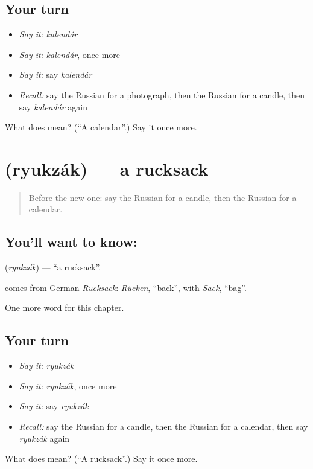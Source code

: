 \subsection*{Your turn}
\begin{itemize}
\raggedright
  \item \emph{Say it:} \emph{kalendár}
  \item \emph{Say it:} \emph{kalendár}, once more
  \item \emph{Say it:} say \emph{kalendár}
  \item \emph{Recall:} say the Russian for a photograph, then the Russian for a candle, then say \emph{kalendár} again
\end{itemize}

\begin{tcolorbox}[breakable,colback=teal!4,colframe=teal!35!black,title={Before you move on}]
What does  mean? (\textquotedblleft{}A calendar\textquotedblright{}.) Say it once more.
\end{tcolorbox}
\section[\texorpdfstring{\ru{рюкзак} (ryukzák)}{рюкзак (ryukzák)}]{ (ryukzák) — a rucksack}

\label{lesson:RU-C100-rucksack}



\begin{quote}
Before the new one: say the Russian for a candle, then the Russian for a calendar.
\end{quote}

\subsection*{You'll want to know: }
\textbf{} (\emph{ryukzák}) — \textquotedblleft{}a rucksack\textquotedblright{}.

\begin{cousinweb}
\textbf{} comes from German \emph{Rucksack}: \emph{Rücken}, \textquotedblleft{}back\textquotedblright{}, with \emph{Sack}, \textquotedblleft{}bag\textquotedblright{}.
\end{cousinweb}

\begin{grammarlens}[title={What you've built}]
One more word for this chapter.
\end{grammarlens}

\subsection*{Your turn}
\begin{itemize}
\raggedright
  \item \emph{Say it:} \emph{ryukzák}
  \item \emph{Say it:} \emph{ryukzák}, once more
  \item \emph{Say it:} say \emph{ryukzák}
  \item \emph{Recall:} say the Russian for a candle, then the Russian for a calendar, then say \emph{ryukzák} again
\end{itemize}

\begin{tcolorbox}[breakable,colback=teal!4,colframe=teal!35!black,title={Before you move on}]
What does  mean? (\textquotedblleft{}A rucksack\textquotedblright{}.) Say it once more.
\end{tcolorbox}
